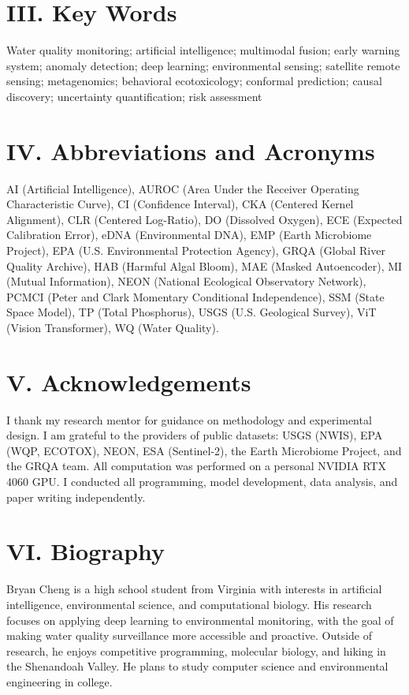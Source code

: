 \documentclass[12pt]{article}
\begin{document}
\section*{III. Key Words}
\vspace{-4pt}
Water quality monitoring; artificial intelligence; multimodal fusion; early warning system; anomaly detection; deep learning; environmental sensing; satellite remote sensing; metagenomics; behavioral ecotoxicology; conformal prediction; causal discovery; uncertainty quantification; risk assessment

\section*{IV. Abbreviations and Acronyms}
\vspace{-4pt}
AI (Artificial Intelligence), AUROC (Area Under the Receiver Operating Characteristic Curve), CI (Confidence Interval), CKA (Centered Kernel Alignment), CLR (Centered Log-Ratio), DO (Dissolved Oxygen), ECE (Expected Calibration Error), eDNA (Environmental DNA), EMP (Earth Microbiome Project), EPA (U.S. Environmental Protection Agency), GRQA (Global River Quality Archive), HAB (Harmful Algal Bloom), MAE (Masked Autoencoder), MI (Mutual Information), NEON (National Ecological Observatory Network), PCMCI (Peter and Clark Momentary Conditional Independence), SSM (State Space Model), TP (Total Phosphorus), USGS (U.S. Geological Survey), ViT (Vision Transformer), WQ (Water Quality).

\section*{V. Acknowledgements}
\vspace{-4pt}
I thank my research mentor for guidance on methodology and experimental design. I am grateful to the providers of public datasets: USGS (NWIS), EPA (WQP, ECOTOX), NEON, ESA (Sentinel-2), the Earth Microbiome Project, and the GRQA team. All computation was performed on a personal NVIDIA RTX 4060 GPU. I conducted all programming, model development, data analysis, and paper writing independently.

\section*{VI. Biography}
\vspace{-4pt}
Bryan Cheng is a high school student from Virginia with interests in artificial intelligence, environmental science, and computational biology. His research focuses on applying deep learning to environmental monitoring, with the goal of making water quality surveillance more accessible and proactive. Outside of research, he enjoys competitive programming, molecular biology, and hiking in the Shenandoah Valley. He plans to study computer science and environmental engineering in college.
\end{document}
